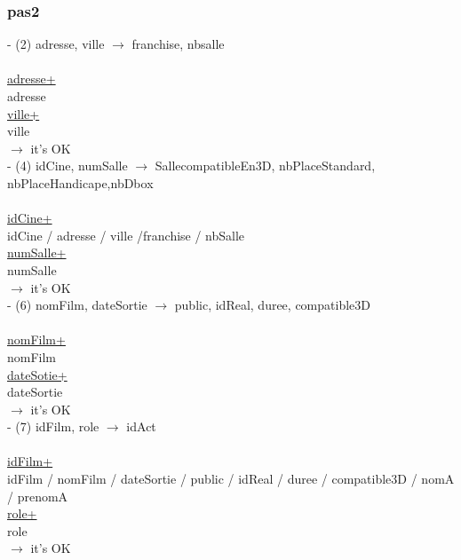 \documentclass[a4paper,sffamily,12pt]{article}
\begin{document}
				\vspace{0.5cm}
									
			\subsubsection{pas2}

				\vspace{0.5cm}
	
				\noindent - (2) adresse, ville $\rightarrow$ franchise, nbsalle \\
					\\
					\underline{adresse+} \\
					adresse \\
					\underline{ville+} \\
					ville \\
				$\rightarrow$ it's OK \\

				\noindent - (4) idCine, numSalle $\rightarrow$ SallecompatibleEn3D, nbPlaceStandard, nbPlaceHandicape,nbDbox \\
					\\
					\underline{idCine+} \\
					idCine / adresse / ville /franchise / nbSalle \\
					\underline{numSalle+} \\
					numSalle \\
				$\rightarrow$ it's OK \\
				
				\noindent - (6) nomFilm, dateSortie $\rightarrow$ public, idReal, duree, compatible3D \\																						\\
					\underline{nomFilm+} \\
					nomFilm \\
					\underline{dateSotie+} \\
					dateSortie \\
				$\rightarrow$ it's OK \\
			
				\noindent - (7) idFilm, role $\rightarrow$  idAct \\
					\\
					\underline{idFilm+} \\
					idFilm / nomFilm / dateSortie / public / idReal / duree / compatible3D / nomA / prenomA \\
					\underline{role+} \\
					role \\
				$\rightarrow$ it's OK \\
					
\end{document}
